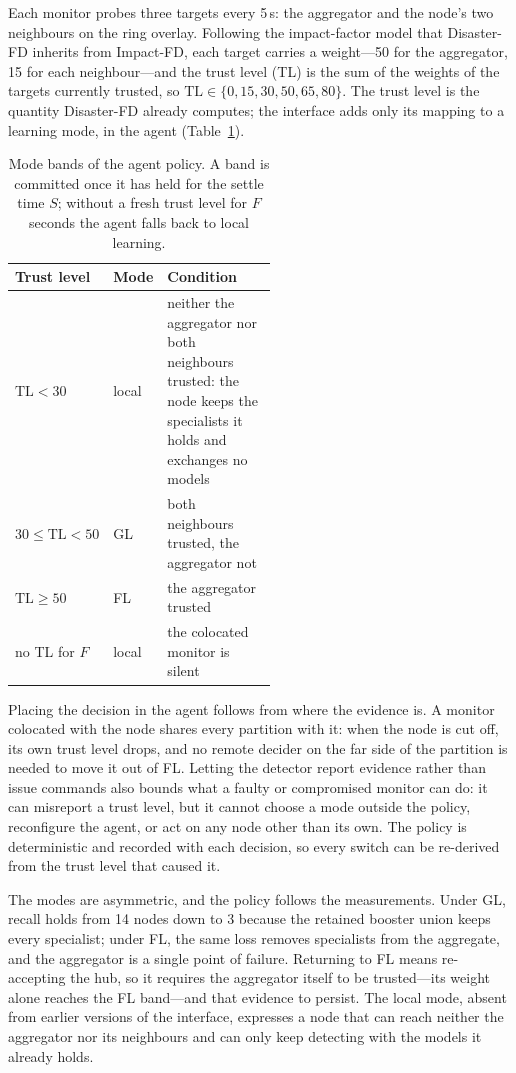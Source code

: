 Each monitor probes three targets every 5\,s: the aggregator and the node's two neighbours
on the ring overlay. Following the impact-factor model that Disaster-FD inherits from
Impact-FD, each target carries a weight---50 for the aggregator, 15 for each
neighbour---and the trust level (TL) is the sum of the weights of the targets currently
trusted, so $\mathrm{TL} \in \{0, 15, 30, 50, 65, 80\}$. The trust level is the quantity
Disaster-FD already computes; the interface adds only its mapping to a learning mode, in
the agent (Table~\ref{tab:authority}).

\begin{table}[htbp]
\centering
\caption{Mode bands of the agent policy. A band is committed once it has held for the
settle time $S$; without a fresh trust level for $F$ seconds the agent falls back to local
learning.}
\label{tab:authority}
\begin{tabular}{@{}llp{0.52\linewidth}@{}}
\toprule
Trust level & Mode & Condition \\
\midrule
$\mathrm{TL} < 30$ & local & neither the aggregator nor both neighbours trusted: the node keeps the specialists it holds and exchanges no models \\
$30 \leq \mathrm{TL} < 50$ & GL & both neighbours trusted, the aggregator not \\
$\mathrm{TL} \geq 50$ & FL & the aggregator trusted \\
no TL for $F$ & local & the colocated monitor is silent \\
\bottomrule
\end{tabular}
\end{table}

Placing the decision in the agent follows from where the evidence is. A monitor colocated
with the node shares every partition with it: when the node is cut off, its own trust
level drops, and no remote decider on the far side of the partition is needed to move it
out of FL. Letting the detector report evidence rather than issue commands also bounds what
a faulty or compromised monitor can do: it can misreport a trust level, but it cannot
choose a mode outside the policy, reconfigure the agent, or act on any node other than its
own. The policy is deterministic and recorded with each decision, so every switch can be
re-derived from the trust level that caused it.

The modes are asymmetric, and the policy follows the measurements. Under GL, recall holds
from 14 nodes down to 3 because the retained booster union keeps every specialist; under
FL, the same loss removes specialists from the aggregate, and the aggregator is a single
point of failure. Returning to FL means re-accepting the hub, so it requires the
aggregator itself to be trusted---its weight alone reaches the FL band---and that evidence
to persist. The local mode, absent from earlier versions of the interface, expresses a node
that can reach neither the aggregator nor its neighbours and can only keep detecting with
the models it already holds.

